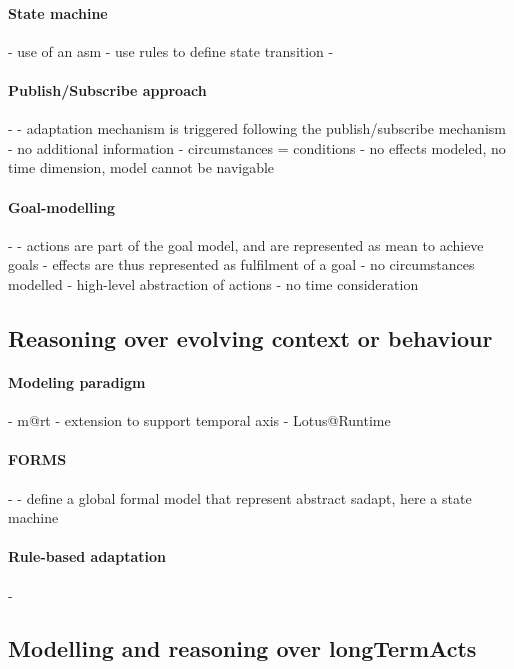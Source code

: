 \paragraph{State machine}
- \cite{DBLP:conf/icse/ArcainiRS15} use of an \gls{asm}
	- use rules to define state transition
- \cite{DBLP:conf/icse/IftikharW14a}
		 
\paragraph{Publish/Subscribe approach}
- \cite{DBLP:conf/icse/BarbosaLMJ17}
	- adaptation mechanism is triggered following the publish/subscribe mechanism
	- no additional information
	- circumstances = conditions
	- no effects modeled, no time dimension, model cannot be navigable
	
\paragraph{Goal-modelling}
- \cite{DBLP:conf/icse/MendoncaAR14}
	- actions are part of the goal model, and are represented as mean to achieve goals
	- effects are thus represented as fulfilment of a goal
	- no circumstances modelled
	- high-level abstraction of actions
	- no time consideration
	
\paragraph{}
	 
	 
	 
	 
	 
	 
	 
	 
\subsection{Reasoning over evolving context or behaviour}

\paragraph{Modeling paradigm}
- \gls{m@rt} \cite{DBLP:journals/computer/BlairBF09, DBLP:journals/computer/MorinBJFS09}
	- extension to support temporal axis \cite{DBLP:conf/seke/0001FNMKT14, DBLP:conf/models/0001FNMKBT14}
- Lotus@Runtime~\cite{DBLP:conf/icse/BarbosaLMJ17}
	
\paragraph{FORMS}
- \cite{DBLP:conf/icse/IftikharW14a}
	- define a global formal model that represent abstract \gls{sadapt}, here a state machine
	
\paragraph{Rule-based adaptation}
- \cite{DBLP:conf/icse/ArcainiRS15}
	


\subsection[Modelling and reasoning over long-term actions]{Modelling and reasoning over \glspl{longTermAct}}